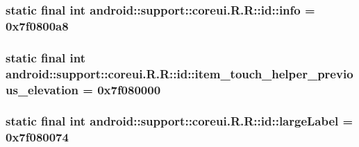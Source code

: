 \hypertarget{classandroid_1_1support_1_1coreui_1_1_r_1_1id_a712dddff22ce4a5105c1eeb3e7e78c5}{
\subsubsection[{info}]{\setlength{\rightskip}{0pt plus 5cm}static final int android::support::coreui.R.R::id::info = 0x7f0800a8}}
\label{classandroid_1_1support_1_1coreui_1_1_r_1_1id_a712dddff22ce4a5105c1eeb3e7e78c5}


\hypertarget{classandroid_1_1support_1_1coreui_1_1_r_1_1id_fe165d8fba0f532372f8096160cab465}{
\subsubsection[{item\_\-touch\_\-helper\_\-previous\_\-elevation}]{\setlength{\rightskip}{0pt plus 5cm}static final int android::support::coreui.R.R::id::item\_\-touch\_\-helper\_\-previous\_\-elevation = 0x7f080000}}
\label{classandroid_1_1support_1_1coreui_1_1_r_1_1id_fe165d8fba0f532372f8096160cab465}


\hypertarget{classandroid_1_1support_1_1coreui_1_1_r_1_1id_586ed112ec44234f80c3c894b2465f5b}{
\subsubsection[{largeLabel}]{\setlength{\rightskip}{0pt plus 5cm}static final int android::support::coreui.R.R::id::largeLabel = 0x7f080074}}
\label{classandroid_1_1support_1_1coreui_1_1_r_1_1id_586ed112ec44234f80c3c894b2465f5b}


